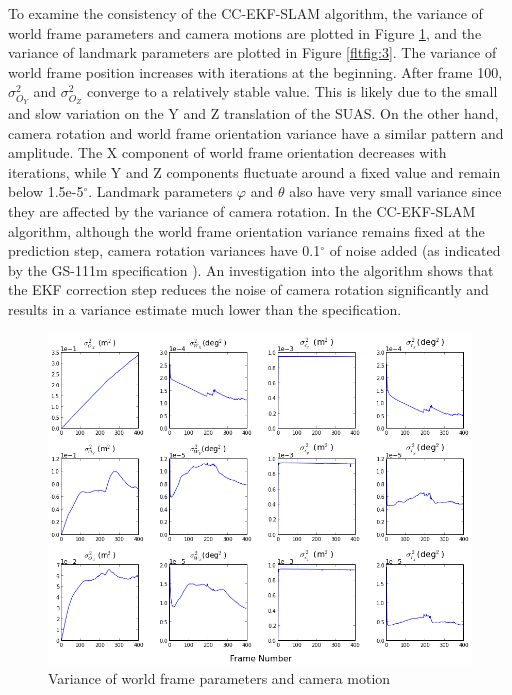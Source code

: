 To examine the consistency of the CC-EKF-SLAM algorithm, the variance
of world frame parameters and camera motions are plotted in Figure
\ref{fltfig:120}, and the variance of landmark parameters are plotted
in Figure \ref{fltfig:3}. The variance of world frame position
increases with iterations at the beginning. After frame 100,
$\sigma^2_{O_Y}$ and $\sigma^2_{O_Z}$ converge to a relatively stable
value. This is likely due to the small and slow variation on the Y and
Z translation of the SUAS. On the other hand, camera rotation and
world frame orientation variance have a similar pattern and amplitude.
The X component of world frame orientation decreases with iterations,
while Y and Z components fluctuate around a fixed value and remain
below 1.5e-5$^\circ$. Landmark parameters $\varphi$ and $\theta$ also
have very small variance since they are affected by the variance of
camera rotation. In the CC-EKF-SLAM algorithm, although the world
frame orientation variance remains fixed at the prediction step,
camera rotation variances have 0.1$^\circ$ of noise added (as indicated
by the GS-111m specification \cite{_athena_????}). An investigation
into the algorithm shows that the EKF correction step reduces the noise of
camera rotation significantly and results in a variance estimate much
lower than the specification.


\begin{figure}[h]
\centering
\includegraphics[width=14cm, keepaspectratio=true]
{./Figures/fltfig/cut1/Figure120.png}
\caption{Variance of world frame parameters and camera motion}
\label{fltfig:120}
\end{figure}


